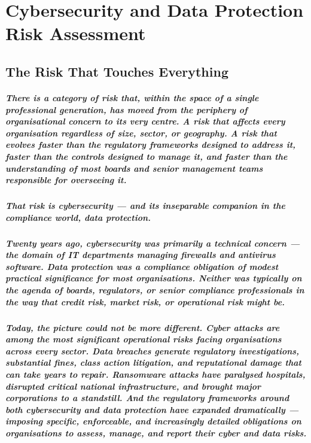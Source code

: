 \chapter{Cybersecurity and Data Protection Risk Assessment}
\label{chap:Cybersecurity and Data Protection Risk Assessment}

\section{The Risk That Touches Everything}
\paragraph{There is a category of risk that, within the space of a single professional generation, has moved from the periphery of organisational concern to its very centre. A risk that affects every organisation regardless of size, sector, or geography. A risk that evolves faster than the regulatory frameworks designed to address it, faster than the controls designed to manage it, and faster than the understanding of most boards and senior management teams responsible for overseeing it.}
\paragraph{That risk is cybersecurity — and its inseparable companion in the compliance world, data protection.}
\paragraph{Twenty years ago, cybersecurity was primarily a technical concern — the domain of IT departments managing firewalls and antivirus software. Data protection was a compliance obligation of modest practical significance for most organisations. Neither was typically on the agenda of boards, regulators, or senior compliance professionals in the way that credit risk, market risk, or operational risk might be.}
\paragraph{Today, the picture could not be more different. Cyber attacks are among the most significant operational risks facing organisations across every sector. Data breaches generate regulatory investigations, substantial fines, class action litigation, and reputational damage that can take years to repair. Ransomware attacks have paralysed hospitals, disrupted critical national infrastructure, and brought major corporations to a standstill. And the regulatory frameworks around both cybersecurity and data protection have expanded dramatically — imposing specific, enforceable, and increasingly detailed obligations on organisations to assess, manage, and report their cyber and data risks.}
